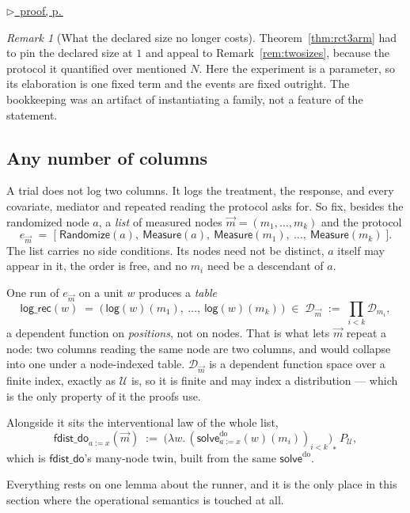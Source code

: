 \documentclass[11pt,a4paper]{article}
\theoremstyle{definition}
\theoremstyle{plain}
\theoremstyle{remark}
\newtheorem{remark}[definition]{Remark}
\newcommand{\dom}{\mathcal{D}}
\newcommand{\Ctx}{\mathcal{U}}         %
\newcommand{\solve}{\mathsf{solve}}
\newcommand{\solvedo}{\solve^{\mathrm{do}}}
\newcommand{\fdo}{\mathsf{fdist\_do}}
\newcommand{\push}[1]{{#1}_{*}}        %
\newcommand{\pfref}[1]{%
  \par\smallskip\noindent
  \hyperref[pf:#1]{\small$\triangleright$\ proof, p.\,\pageref{pf:#1}}\par\smallskip}
\begin{document}
\pfref{thm:randemp}

\begin{remark}[What the declared size no longer costs]
\label{rem:nosize}
Theorem~\ref{thm:rct3arm} had to pin the declared size at $1$ and appeal
to Remark~\ref{rem:twosizes}, because the protocol it quantified over
mentioned $N$. Here the experiment is a parameter, so its elaboration is
one fixed term and the events are fixed outright. The bookkeeping was an
artifact of instantiating a family, not a feature of the statement.
\end{remark}

\subsection{Any number of columns}
\label{sec:gencols}

A trial does not log two columns. It logs the treatment, the response,
and every covariate, mediator and repeated reading the protocol asks for.
So fix, besides the randomized node $a$, a \emph{list} of measured nodes
$\vec m = (m_1,\dots,m_k)$ and the protocol
\[
  e_{\vec m} \;=\;
  \bigl[\;\mathsf{Randomize}(a),\ \mathsf{Measure}(a),\
    \mathsf{Measure}(m_1),\ \dots,\ \mathsf{Measure}(m_k)\;\bigr].
\]
The list carries no side conditions. Its nodes need not be distinct, $a$
itself may appear in it, the order is free, and no $m_i$ need be a
descendant of $a$.

One run of $e_{\vec m}$ on a unit $w$ produces a \emph{table}
\[
  \mathsf{log\_rec}(w) \;=\;
  \bigl(\,\mathsf{log}(w)(m_1),\ \dots,\ \mathsf{log}(w)(m_k)\,\bigr)
  \;\in\; \dom_{\vec m} \;:=\; \textstyle\prod_{i<k}\dom_{m_i} ,
\]
a dependent function on \emph{positions}, not on nodes. That is what lets
$\vec m$ repeat a node: two columns reading the same node are two
columns, and would collapse into one under a node-indexed table.
$\dom_{\vec m}$ is a dependent function space over a finite index, exactly
as $\Ctx$ is, so it is finite and may index a distribution --- which is
the only property of it the proofs use.

Alongside it sits the interventional law of the whole list,
\[
  \fdo_{a := x}(\vec m) \;:=\;
  \push{\bigl(\lambda w.\,(\solvedo_{a := x}(w)(m_i))_{i<k}\bigr)}\ P_\Ctx ,
\]
which is $\fdo$'s many-node twin, built from the same $\solvedo$.

Everything rests on one lemma about the runner, and it is the only place
in this section where the operational semantics is touched at all.
\end{document}
